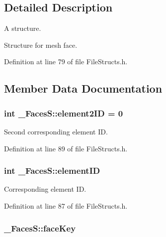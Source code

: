 \subsection{Detailed Description}
A structure. 

Structure for mesh face. 

Definition at line 79 of file File\+Structs.\+h.



\subsection{Member Data Documentation}
\subsubsection[{\texorpdfstring{element2\+ID}{element2ID}}]{\setlength{\rightskip}{0pt plus 5cm}int \+\_\+\+Faces\+S\+::element2\+ID = 0}\hypertarget{struct___faces_s_a6a710d10167fc0966c6b1fd763c55603}{}\label{struct___faces_s_a6a710d10167fc0966c6b1fd763c55603}


Second corresponding element ID. 



Definition at line 89 of file File\+Structs.\+h.

\subsubsection[{\texorpdfstring{element\+ID}{elementID}}]{\setlength{\rightskip}{0pt plus 5cm}int \+\_\+\+Faces\+S\+::element\+ID}\hypertarget{struct___faces_s_a96e133867444b5c1ab6b0ebd281de0fb}{}\label{struct___faces_s_a96e133867444b5c1ab6b0ebd281de0fb}


Corresponding element ID. 



Definition at line 87 of file File\+Structs.\+h.

\subsubsection[{\texorpdfstring{face\+Key}{faceKey}}]{ \+\_\+\+Faces\+S\+::face\+Key}\hypertarget{struct___faces_s_a0b72e5930902a49f376d035d654ecef8}{}\label{struct___faces_s_a0b72e5930902a49f376d035d654ecef8}


